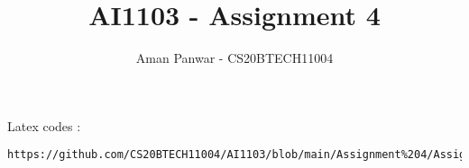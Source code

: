 \documentclass[journal,12pt,twocolumn]{IEEEtran}
\DeclareMathOperator*{\Res}{Res}
\begin{document}
\newcommand{\BEQA}{\begin{eqnarray}}
\newcommand{\EEQA}{\end{eqnarray}}
\newcommand{\define}{\stackrel{\triangle}{=}}

\raggedbottom
\setlength{\parindent}{0pt}
\providecommand{\mbf}{\mathbf}
\providecommand{\pr}[1]{\ensuremath{\Pr\left(#1\right)}}
\providecommand{\qfunc}[1]{\ensuremath{Q\left(#1\right)}}
\providecommand{\sbrak}[1]{\ensuremath{{}\left[#1\right]}}
\providecommand{\lsbrak}[1]{\ensuremath{{}\left[#1\right.}}
\providecommand{\rsbrak}[1]{\ensuremath{{}\left.#1\right]}}
\providecommand{\brak}[1]{\ensuremath{\left(#1\right)}}
\providecommand{\lbrak}[1]{\ensuremath{\left(#1\right.}}
\providecommand{\rbrak}[1]{\ensuremath{\left.#1\right)}}
\providecommand{\cbrak}[1]{\ensuremath{\left\{#1\right\}}}
\providecommand{\lcbrak}[1]{\ensuremath{\left\{#1\right.}}
\providecommand{\rcbrak}[1]{\ensuremath{\left.#1\right\}}}
\theoremstyle{remark}
\newtheorem{rem}{Remark}
\newcommand{\sgn}{\mathop{\mathrm{sgn}}}
\providecommand{\abs}[1]{\vert#1\vert}
\providecommand{\res}[1]{\Res\displaylimits_{#1}} 
\providecommand{\norm}[1]{\lVert#1\rVert}
\providecommand{\mtx}[1]{\mathbf{#1}}
\providecommand{\mean}[1]{E[ #1 ]}
\providecommand{\fourier}{\overset{\mathcal{F}}{ \rightleftharpoons}}
\providecommand{\system}{\overset{\mathcal{H}}{ \longleftrightarrow}}
\newcommand{\solution}{\noindent \textbf{Solution: }}
\newcommand{\cosec}{\,\text{cosec}\,}
\providecommand{\dec}[2]{\ensuremath{\overset{#1}{\underset{#2}{\gtrless}}}}
\newcommand{\myvec}[1]{\ensuremath{\begin{pmatrix}#1\end{pmatrix}}}
\newcommand{\mydet}[1]{\ensuremath{\begin{vmatrix}#1\end{vmatrix}}}
\makeatletter
{}
\makeatother
\let\StandardTheFigure\thefigure
\let\vec\mathbf
\renewcommand{\thefigure}{\theproblem}
\def\putbox#1#2#3{\makebox[0in][l]{\makebox[#1][l]{}\raisebox{\baselineskip}[0in][0in]{\raisebox{#2}[0in][0in]{#3}}}}
     \def\rightbox#1{\makebox[0in][r]{#1}}
     \def\centbox#1{\makebox[0in]{#1}}
     \def\topbox#1{\raisebox{-\baselineskip}[0in][0in]{#1}}
     \def\midbox#1{\raisebox{-0.5\baselineskip}[0in][0in]{#1}}
\vspace{3cm}
\title{AI1103 - Assignment 4}
\author{Aman Panwar - CS20BTECH11004}
\maketitle
\newpage
\bigskip
\renewcommand{\thefigure}{\theenumi}
\renewcommand{\thetable}{\theenumi}
%
Latex codes : 
%
\begin{lstlisting}
https://github.com/CS20BTECH11004/AI1103/blob/main/Assignment%204/Assignment%204.tex
\end{lstlisting}
\end{document}
